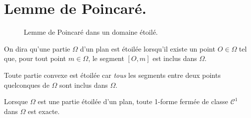 \section{Lemme de Poincaré.}
\begin{figure}[ht]
 \centering
 
 \caption{Lemme de Poincaré dans un domaine étoilé.}
 \label{fig:C6308_3}
\end{figure}
\begin{defi}
 On dira qu'une partie $\Omega$ d'un plan est étoilée lorsqu'il existe un point $O\in \Omega$ tel que, pour tout point $m\in \Omega$, le segment $[O,m]$ est inclus dans $\Omega$.
\end{defi}
\begin{rem}
 Toute partie convexe est étoilée car \emph{tous} les segments entre deux points quelconques de $\Omega$ sont inclus dans $\Omega$.
\end{rem}
\begin{thm}
Lorsque $\Omega$ est une partie étoilée d'un plan, toute 1-forme fermée de classe $\mathcal C^1$ dans $\Omega$  est exacte. 
\end{thm}
